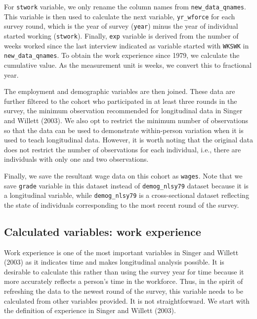 \documentclass[12pt]{article}
\begin{document}
For \texttt{stwork} variable, we only rename the column names from \texttt{new\_data\_qnames}. This variable is then used to calculate the next variable, \texttt{yr\_wforce} for each survey round, which is the year of survey (\texttt{year}) minus the year of individual started working (\texttt{stwork}). Finally, \texttt{exp} variable is derived from the number of weeks worked since the last interview indicated as variable started with \texttt{WKSWK} in \texttt{new\_data\_qnames}. To obtain the work experience since 1979, we calculate the cumulative value. As the measurement unit is weeks, we convert this to fractional year.

The employment and demographic variables are then joined. These data are further filtered to the cohort who participated in at least three rounds in the survey, the minimum observation recommended for longitudinal data in Singer and Willett (2003). We also opt to restrict the minimum number of observations so that the data can be used to demonstrate within-person variation when it is used to teach longitudinal data. However, it is worth noting that the original data does not restrict the number of observations for each individual, i.e., there are individuals with only one and two observations.

Finally, we save the resultant wage data on this cohort as \texttt{wages}. Note that we save \texttt{grade} variable in this dataset instead of \texttt{demog\_nlsy79} dataset because it is a longitudinal variable, while \texttt{demog\_nlsy79} is a cross-sectional dataset reflecting the state of individuals corresponding to the most recent round of the survey.

\hypertarget{calculated-variables-work-experience}{%
\subsection{Calculated variables: work experience}\label{calculated-variables-work-experience}}

Work experience is one of the most important variables in Singer and Willett (2003) as it indicates time and makes longitudinal analysis possible. It is desirable to calculate this rather than using the survey year for time because it more accurately reflects a person's time in the workforce. Thus, in the spirit of refreshing the data to the newest round of the survey, this variable needs to be calculated from other variables provided. It is not straightforward. We start with the definition of experience in Singer and Willett (2003).
\end{document}
